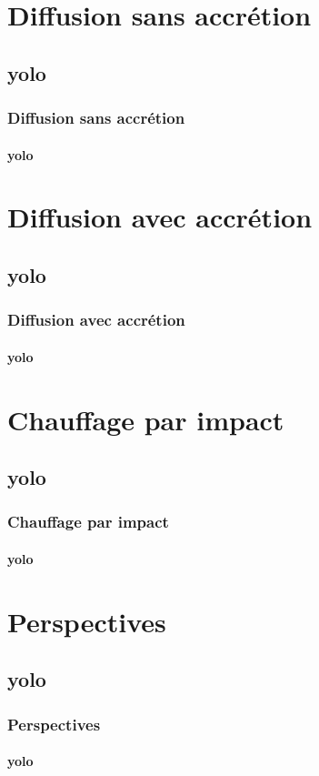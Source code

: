 \documentclass{beamer}
\begin{document}
\section{Diffusion sans accrétion}
\subsection{yolo}

\begin{frame}
	\frametitle{Diffusion sans accrétion}
	\framesubtitle{yolo}
	
\end{frame}

\section{Diffusion avec accrétion}
\subsection{yolo}

\begin{frame}
	\frametitle{Diffusion avec accrétion}
	\framesubtitle{yolo}
	
\end{frame}

\section{Chauffage par impact}
\subsection{yolo}

\begin{frame}
	\frametitle{Chauffage par impact}
	\framesubtitle{yolo}
	
\end{frame}

\section{Perspectives}
\subsection{yolo}

\begin{frame}
	\frametitle{Perspectives}
	\framesubtitle{yolo}
	
\end{frame}
\end{document}
